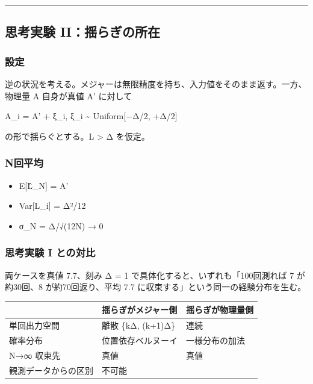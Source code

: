 \documentclass[
]{ltjsarticle}
\newcounter{none} %
\providecommand{\tightlist}{%
  \setlength{\itemsep}{0pt}\setlength{\parskip}{0pt}}
\begin{document}
\begin{center}\rule{0.5\linewidth}{0.5pt}\end{center}

\subsection{思考実験
II：揺らぎの所在}\label{ux601dux8003ux5b9fux9a13-iiux63faux3089ux304eux306eux6240ux5728}

\subsubsection{設定}\label{ux8a2dux5b9a-1}

逆の状況を考える。メジャーは無限精度を持ち、入力値をそのまま返す。一方、物理量
A 自身が真値 A' に対して

A\_i = A' + ξ\_i, ξ\_i \textasciitilde{} Uniform{[}−Δ/2, +Δ/2{]}

の形で揺らぐとする。L \textgreater{} Δ を仮定。

\subsubsection{N回平均}\label{nux56deux5e73ux5747}

\begin{itemize}
\tightlist
\item
  E{[}L̂\_N{]} = A'
\item
  Var{[}L\_i{]} = Δ²/12
\item
  σ\_N = Δ/√(12N) → 0
\end{itemize}

\subsubsection{思考実験 I
との対比}\label{ux601dux8003ux5b9fux9a13-i-ux3068ux306eux5bfeux6bd4}

両ケースを真値 7.7、刻み Δ = 1 で具体化すると、いずれも「100回測れば 7
が約30回、8 が約70回返り、平均 7.7
に収束する」という同一の経験分布を生む。

{\def\LTcaptype{none} %
\begin{longtable}[]{@{}lll@{}}
\toprule\noalign{}
& 揺らぎがメジャー側 & 揺らぎが物理量側 \\
\midrule\noalign{}
\endhead
\bottomrule\noalign{}
\endlastfoot
単回出力空間 & 離散 \{kΔ, (k+1)Δ\} & 連続 \\
確率分布 & 位置依存ベルヌーイ & 一様分布の加法 \\
N→∞ 収束先 & 真値 & 真値 \\
観測データからの区別 & 不可能 & \\
\end{longtable}
}
\end{document}
